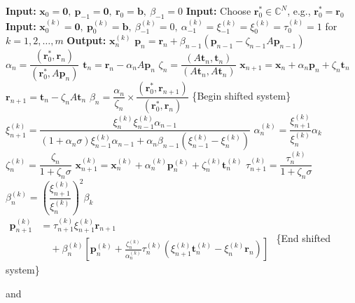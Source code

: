 \begin{algorithm}[H]\caption{{The shifted BiCGSTAB method}}\label{alg:shifted-bicgstab}\begin{algorithmic}[1]
\Statex\textbf{Input:} $\bm x_0=\bm0,\ \bm p_{-1}=\bm0,\ \bm r_0=\bm b,\ \beta_{-1}=0$
\Statex\textbf{Input:} {Choose $\bm r_0^*\in\mathbb C^N$, e.g., $\bm r_0^*=\bm r_0$}
\Statex\textbf{Input:} $\bm x_0^{(k)}=\bm0,\ \bm p_0^{(k)}=\bm b,\ \beta_{-1}^{(k)}=0,\ \alpha_{-1}^{(k)}=\xi_{-1}^{(k)}=\xi_0^{(k)}=\tau_0^{(k)}=1$ {for} $k=1,2,\ldots,m$
\Statex\textbf{Output:} $\bm x_n^{(k)}$
\State $\bm p_n=\bm r_n+\beta_{n-1}(\bm p_{n-1}-\zeta_{n-1}A\bm p_{n-1})$
\State $\alpha_n=\dfrac{(\bm r_0^*,\bm r_n)}{(\bm r_0^*,A\bm p_n)}$
\State $\bm t_n=\bm r_n-\alpha_nA\bm p_n$
\State $\zeta_n=\dfrac{(A\bm t_n,\bm t_n)}{(A\bm t_n,A\bm t_n)}$
\State $\bm x_{n+1}=\bm x_n+\alpha_n\bm p_n+\zeta_n\bm t_n$
\State $\bm r_{n+1}=\bm t_n-\zeta_nA\bm t_n$
\State $\beta_n=\dfrac{\alpha_n}{\zeta_n}\times\dfrac{(\bm r_0^*,\bm r_{n+1})}{(\bm r_0^*,\bm r_n)}$
\State \{{Begin shifted system}\}
\State $\xi_{n+1}^{(k)}=\dfrac{\xi_n^{(k)}\xi_{n-1}^{(k)}\alpha_{n-1}}{(1+\alpha_n\sigma)\xi_{n-1}^{(k)}\alpha_{n-1}+\alpha_n\beta_{n-1}(\xi_{n-1}^{(k)}-\xi_n^{(k)})}$
\State $\alpha_n^{(k)}=\dfrac{\xi_{n+1}^{(k)}}{\xi_n^{(k)}}\alpha_k$
\State $\zeta_n^{(k)}=\dfrac{\zeta_n}{1+\zeta_n\sigma}$
\State $\bm x_{n+1}^{(k)}=\bm x_n^{(k)}+\alpha_n^{(k)}\bm p_n^{(k)}+\zeta_n^{(k)}\bm t_n^{(k)}$
\State $\tau_{n+1}^{(k)}=\dfrac{\tau_n^{(k)}}{1+\zeta_n\sigma}$
\State $\beta_n^{(k)}=\left(\dfrac{\xi_{n+1}^{(k)}}{\xi_n^{(k)}}\right)^2\beta_k$
\State $\begin{aligned}\bm p_{n+1}^{(k)}&=\tau_{n+1}^{(k)}\xi_{n+1}^{(k)}\bm r_{n+1}\\&\quad+\beta_n^{(k)}\left[\bm p_n^{(k)}+\frac{\zeta_n^{(k)}}{\alpha_n^{(k)}}\tau_n^{(k)}(\xi_{n+1}^{(k)}\bm t_n^{(k)}-\xi_n^{(k)}\bm r_n)\right]\end{aligned}$
\EndFor
\State \{{End shifted system}\}
\EndFor\end{algorithmic}\end{algorithm}
{and}

